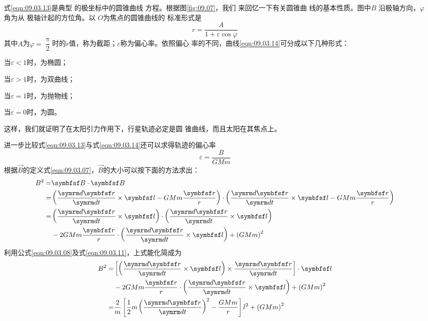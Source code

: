 式\eqref{eqn:09.03.13}是典型
的极坐标中的圆锥曲线
方程。根据图\ref{fig:09.07}，我们
来回忆一下有关圆锥曲
线的基本性质。图中$ B $
沿极轴方向，$ \varphi $角为从
极轴计起的方位角。以
$ O $为焦点的圆锥曲线的
标准形式是
\begin{equation}\label{eqn:09.03.14}
  r = \frac { A } { 1 + \varepsilon \cos \varphi }
\end{equation}
其中$ A $为$ \varphi = \dfrac { \uppi } { 2 } $时的$ r $值，称为截距；$ \varepsilon $称为偏心率。依照偏心
率的不同，曲线\eqref{eqn:09.03.14}可分成以下几种形式：

当$ \varepsilon < 1 $时，为椭圆；

当$ \varepsilon > 1 $时，为双曲线；

当$ \varepsilon = 1 $时，为抛物线；

当$ \varepsilon = 0 $时，为圆。

这样，我们就证明了在太阳引力作用下，行星轨迹必定是圆
锥曲线，而且太阳在其焦点上。

进一步比较式\eqref{eqn:09.03.13}与式\eqref{eqn:09.03.14}还可以求得轨迹的偏心率
\begin{equation}\label{eqn:09.03.15}
  \varepsilon = \frac { B } { G M m }
\end{equation}
根据$ \vec{B} $的定义式\eqref{eqn:09.03.07}，$\vec{B}$的大小可以按下面的方法求出：
\begin{equation*}
  \begin{split}
    B ^ { 2 } =& \vec{B} \cdot \vec{B} \\
    =& \left( \frac { \dif \vec{r} } { \dif t } \times \vec{l} - G M m \frac { \vec{r} } { r } \right) \cdot \left( \frac { \dif \vec{r} } { \dif t } \times \vec{l} - G M m \frac { \vec{r} } { r } \right) \\
    =& \left( \frac { \dif \vec{r} } { \dif t } \times \vec{l} \right) \cdot \left( \frac { \dif \vec{r} } { \dif t } \times \vec{l} \right) \\
    & - 2 G M m \frac { \vec{r} } { r }  \cdot \left( \frac { \dif \vec{r} } { \dif t } \times \vec{l} \right) + \left( G M m \right) ^ { 2 }
  \end{split}
\end{equation*}
利用公式\eqref{eqn:09.03.08}及式\eqref{eqn:09.03.11}，上式能化简成为
\begin{equation*}
  \begin{split}
    B ^ { 2 } =& \left[ \left( \frac { \dif \vec{r} } { \dif t } \times \vec{l} \right) \times \frac { \dif \vec{r} } { \dif t } \right] \cdot \vec{ l } \\
    &- 2 G M m \frac { \vec{r} } { r }  \cdot \left( \frac { \dif \vec{r} } { \dif t } \times \vec{l} \right) + \left( G M m \right) ^ { 2 } \\
    =& \frac { 2 } { m } \left[ \frac { 1 } { 2 } m \left( \frac { \dif \vec{r} } { \dif t } \right) ^ { 2 } - \frac { G M m } { r } \right] l ^ { 2 } + \left( G M m \right) ^ { 2 }
  \end{split}
\end{equation*}

